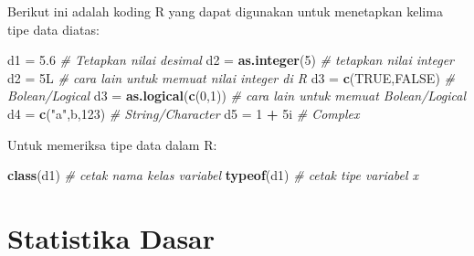 \documentclass[
]{book}
\newenvironment{Shaded}{\begin{snugshade}}{\end{snugshade}}
\newcommand{\CommentTok}[1]{\textcolor[rgb]{0.56,0.35,0.01}{\textit{#1}}}
\newcommand{\ConstantTok}[1]{\textcolor[rgb]{0.56,0.35,0.01}{#1}}
\newcommand{\DecValTok}[1]{\textcolor[rgb]{0.00,0.00,0.81}{#1}}
\newcommand{\FloatTok}[1]{\textcolor[rgb]{0.00,0.00,0.81}{#1}}
\newcommand{\FunctionTok}[1]{\textcolor[rgb]{0.13,0.29,0.53}{\textbf{#1}}}
\newcommand{\NormalTok}[1]{#1}
\newcommand{\OtherTok}[1]{\textcolor[rgb]{0.56,0.35,0.01}{#1}}
\newcommand{\SpecialCharTok}[1]{\textcolor[rgb]{0.81,0.36,0.00}{\textbf{#1}}}
\newcommand{\StringTok}[1]{\textcolor[rgb]{0.31,0.60,0.02}{#1}}
\begin{document}
Berikut ini adalah koding R yang dapat digunakan untuk menetapkan kelima tipe data diatas:

\begin{Shaded}
\begin{Highlighting}[]
\NormalTok{d1 }\OtherTok{=} \FloatTok{5.6}                       \CommentTok{\# Tetapkan nilai desimal }
\NormalTok{d2 }\OtherTok{=} \FunctionTok{as.integer}\NormalTok{(}\DecValTok{5}\NormalTok{)             }\CommentTok{\# tetapkan nilai integer}
\NormalTok{d2 }\OtherTok{=}\NormalTok{ 5L                        }\CommentTok{\# cara lain untuk memuat nilai integer di R}
\NormalTok{d3 }\OtherTok{=} \FunctionTok{c}\NormalTok{(}\ConstantTok{TRUE}\NormalTok{,}\ConstantTok{FALSE}\NormalTok{)             }\CommentTok{\# Bolean/Logical}
\NormalTok{d3 }\OtherTok{=} \FunctionTok{as.logical}\NormalTok{(}\FunctionTok{c}\NormalTok{(}\DecValTok{0}\NormalTok{,}\DecValTok{1}\NormalTok{))        }\CommentTok{\# cara lain untuk memuat Bolean/Logical}
\NormalTok{d4 }\OtherTok{=} \FunctionTok{c}\NormalTok{(}\StringTok{"a"}\NormalTok{,}\StringTok{\textquotesingle{}b\textquotesingle{}}\NormalTok{,}\StringTok{\textquotesingle{}123\textquotesingle{}}\NormalTok{)          }\CommentTok{\# String/Character}
\NormalTok{d5 }\OtherTok{=} \DecValTok{1} \SpecialCharTok{+}\NormalTok{ 5i                    }\CommentTok{\# Complex }
\end{Highlighting}
\end{Shaded}

Untuk memeriksa tipe data dalam R:

\begin{Shaded}
\begin{Highlighting}[]
\FunctionTok{class}\NormalTok{(d1)                      }\CommentTok{\# cetak nama kelas variabel}
\FunctionTok{typeof}\NormalTok{(d1)                     }\CommentTok{\# cetak tipe variabel x}
\end{Highlighting}
\end{Shaded}

\hypertarget{statistika-dasar}{%
\section{Statistika Dasar}\label{statistika-dasar}}
\end{document}
